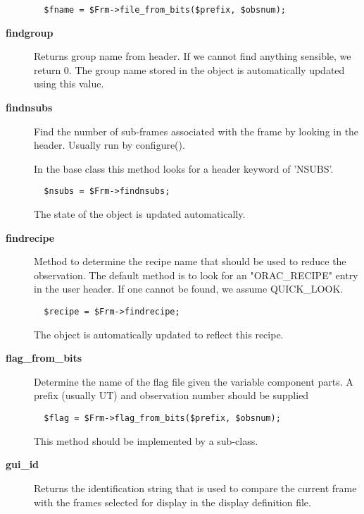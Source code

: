 \begin{description}
\begin{verbatim}
  $fname = $Frm->file_from_bits($prefix, $obsnum);
\end{verbatim}

\item[\textbf{findgroup}] \mbox{}

Returns group name from header.  If we cannot find anything sensible,
we return 0.  The group name stored in the object is automatically
updated using this value.


\item[\textbf{findnsubs}] \mbox{}

Find the number of sub-frames associated with the frame by looking in
the header. Usually run by configure().



In the base class this method looks for a header keyword of 'NSUBS'.

\begin{verbatim}
  $nsubs = $Frm->findnsubs;
\end{verbatim}


The state of the object is updated automatically.


\item[\textbf{findrecipe}] \mbox{}

Method to determine the recipe name that should be used to reduce the
observation.  The default method is to look for an "ORAC\_RECIPE" entry
in the user header. If one cannot be found, we assume QUICK\_LOOK.

\begin{verbatim}
  $recipe = $Frm->findrecipe;
\end{verbatim}


The object is automatically updated to reflect this recipe.


\item[\textbf{flag\_from\_bits}] \mbox{}

Determine the name of the flag file given the variable
component parts. A prefix (usually UT) and observation number
should be supplied

\begin{verbatim}
  $flag = $Frm->flag_from_bits($prefix, $obsnum);
\end{verbatim}


This method should be implemented by a sub-class.


\item[\textbf{gui\_id}] \mbox{}

Returns the identification string that is used to compare the
current frame with the frames selected for display in the
display definition file.




\end{description}
